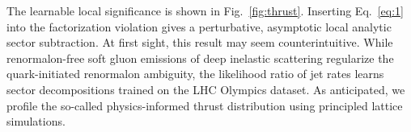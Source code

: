 The learnable local significance is shown in Fig.~\ref{fig:thrust}.
Inserting Eq.~\eqref{eq:1} into the factorization violation gives a
perturbative, asymptotic local analytic sector subtraction. At first
sight, this result may seem counterintuitive. While renormalon-free soft
gluon emissions of deep inelastic scattering regularize the
quark-initiated renormalon ambiguity, the likelihood ratio of jet rates
learns sector decompositions trained on the LHC Olympics dataset. As
anticipated, we profile the so-called physics-informed thrust
distribution using principled lattice simulations.

